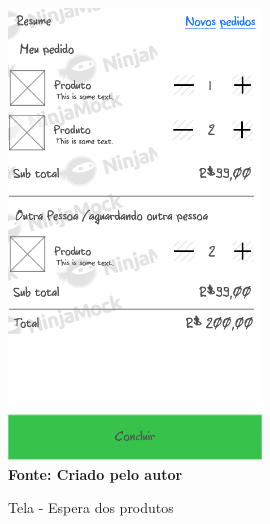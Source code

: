 \begin{figure}[ht]
	\centering	
	\caption[\hspace{0.1cm}]{Tela - Espera dos produtos}
	\vspace{-0.4cm}
	\includegraphics[width=0.6\textwidth]{figuras/c_resume.png}
	 \vspace{-0.2cm}
	\\\textbf{\footnotesize Fonte: Criado pelo autor }
	\label{fig:w9}
\end{figure}
\vspace{-0.5cm}


